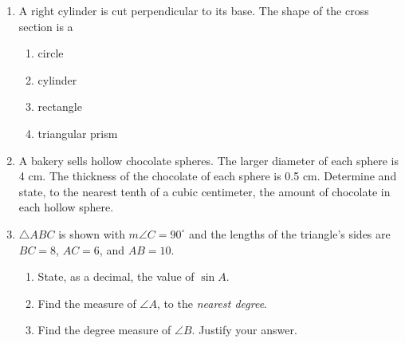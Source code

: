 \documentclass[12pt, twoside]{article}
\begin{document}
\begin{enumerate}
  \item A right cylinder is cut perpendicular to its base. The shape of the cross section is a
    \begin{enumerate}
      \item circle
      \item cylinder
      \item rectangle
      \item triangular prism
    \end{enumerate}

  \item A bakery sells hollow chocolate spheres. The larger diameter of each sphere is 4 cm. The thickness of the chocolate of each sphere is 0.5 cm. Determine and state, to the nearest tenth of a cubic centimeter, the amount of chocolate in each hollow sphere.\\[0.5cm]

\newpage

  \item $\triangle ABC$ is shown with $m\angle C=90^\circ$ and the lengths of the triangle's sides are $BC=8$, $AC=6$, and $AB=10$.
  \begin{multicols}{2}
        \begin{enumerate}
        \item State, as a decimal, the value of $\sin A$. \vspace{0.75cm}
        \item Find the measure of $\angle A$, to the \emph{nearest degree}. \vspace{0.75cm}
        \item Find the degree measure of $\angle B$. Justify your answer.
      \end{enumerate}
    \end{multicols}
    \vspace{1.25cm}


\end{enumerate}
\end{document}
